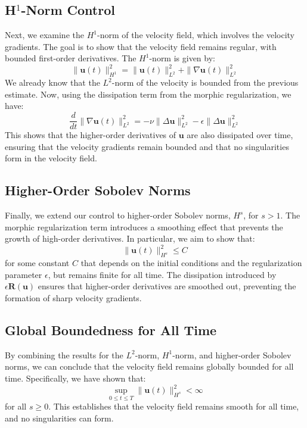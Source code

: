 \documentclass{article}
\begin{document}
\subsection*{H\(^1\)-Norm Control}

Next, we examine the \( H^1 \)-norm of the velocity field, which involves the velocity gradients. The goal is to show that the velocity field remains regular, with bounded first-order derivatives. The \( H^1 \)-norm is given by:
\[
\|\mathbf{u}(t)\|_{H^1}^2 = \|\mathbf{u}(t)\|_{L^2}^2 + \|\nabla \mathbf{u}(t)\|_{L^2}^2
\]
We already know that the \( L^2 \)-norm of the velocity is bounded from the previous estimate. Now, using the dissipation term from the morphic regularization, we have:
\[
\frac{d}{dt} \|\nabla \mathbf{u}(t)\|_{L^2}^2 = -\nu \|\Delta \mathbf{u}\|_{L^2}^2 - \epsilon \|\Delta \mathbf{u}\|_{L^2}^2
\]
This shows that the higher-order derivatives of \( \mathbf{u} \) are also dissipated over time, ensuring that the velocity gradients remain bounded and that no singularities form in the velocity field.

\subsection*{Higher-Order Sobolev Norms}

Finally, we extend our control to higher-order Sobolev norms, \( H^s \), for \( s > 1 \). The morphic regularization term introduces a smoothing effect that prevents the growth of high-order derivatives. In particular, we aim to show that:
\[
\|\mathbf{u}(t)\|_{H^s}^2 \leq C
\]
for some constant \( C \) that depends on the initial conditions and the regularization parameter \( \epsilon \), but remains finite for all time. The dissipation introduced by \( \epsilon \mathbf{R}(\mathbf{u}) \) ensures that higher-order derivatives are smoothed out, preventing the formation of sharp velocity gradients.

\subsection*{Global Boundedness for All Time}

By combining the results for the \( L^2 \)-norm, \( H^1 \)-norm, and higher-order Sobolev norms, we can conclude that the velocity field remains globally bounded for all time. Specifically, we have shown that:
\[
\sup_{0 \leq t \leq T} \|\mathbf{u}(t)\|_{H^s}^2 < \infty
\]
for all \( s \geq 0 \). This establishes that the velocity field remains smooth for all time, and no singularities can form.
\end{document}
